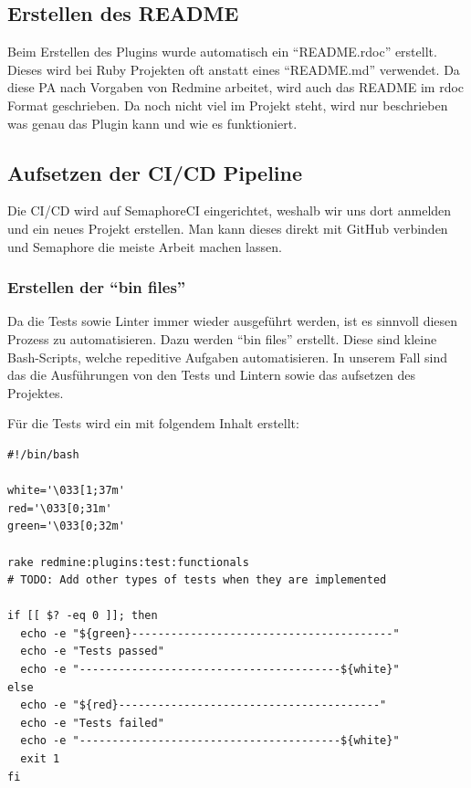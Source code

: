 \begin{minipage}{\textwidth}
  \subsection{Erstellen des README}
  Beim Erstellen des Plugins wurde automatisch ein \enquote{README.rdoc} erstellt. Dieses wird bei Ruby Projekten
  oft anstatt eines \enquote{README.md} verwendet. Da diese PA nach Vorgaben von Redmine arbeitet, wird auch das
  README im rdoc Format geschrieben. \newline
  Da noch nicht viel im Projekt steht, wird nur beschrieben was genau das Plugin kann und wie es funktioniert. \newline
\end{minipage}

\subsection{Aufsetzen der CI/CD Pipeline}
Die CI/CD wird auf SemaphoreCI eingerichtet, weshalb wir uns dort anmelden und ein neues Projekt erstellen. Man kann dieses
direkt mit GitHub verbinden und Semaphore die meiste Arbeit machen lassen.

\subsubsection{Erstellen der \enquote{bin files}}
Da die Tests sowie Linter immer wieder ausgeführt werden, ist es sinnvoll diesen Prozess zu automatisieren. Dazu werden 
\enquote{bin files} erstellt. Diese sind kleine Bash-Scripts, welche repeditive Aufgaben automatisieren. In unserem Fall sind
das die Ausführungen von den Tests und Lintern sowie das aufsetzen des Projektes. \newline

\begin{minipage}{\textwidth}
  Für die Tests wird ein  mit folgendem Inhalt erstellt:
  \begin{codebox}[]
    \begin{verbatim}
#!/bin/bash

white='\033[1;37m'
red='\033[0;31m'
green='\033[0;32m'

rake redmine:plugins:test:functionals
# TODO: Add other types of tests when they are implemented

if [[ $? -eq 0 ]]; then
  echo -e "${green}----------------------------------------"
  echo -e "Tests passed"
  echo -e "----------------------------------------${white}"
else
  echo -e "${red}----------------------------------------"
  echo -e "Tests failed"
  echo -e "----------------------------------------${white}"
  exit 1
fi
    \end{verbatim}
  \end{codebox}
\end{minipage}

